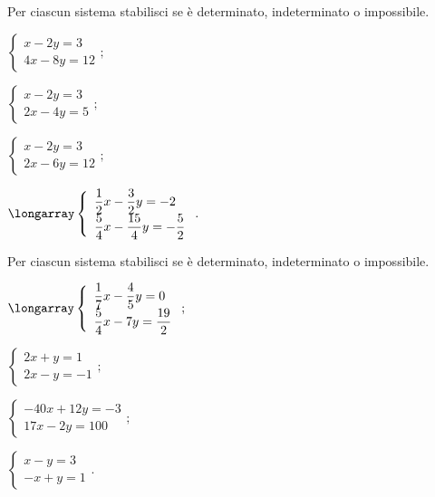 \begin{esercizio}
 \label{ese:19.33}
Per ciascun sistema stabilisci se è determinato, indeterminato o impossibile.
\begin{multicols}{2}
\begin{enumeratea}
\item $\left\{\begin{array}{l}x-2y=3 \\4x-8y=12\end{array}\right.;$
\item $\left\{\begin{array}{l}x-2y=3 \\2x-4y=5\end{array}\right.;$
\item $\left\{\begin{array}{l}x-2y=3 \\2x-6y=12\end{array}\right.;$
\item $\longarray\left\{\begin{array}{l}\dfrac{1}{2}x-\dfrac{3}{2}y=-2\\\dfrac{5}{4}x-\dfrac{15}{4}y=-{\dfrac{5}{2}}\end{array}\right..$
\end{enumeratea}
\end{multicols}
\end{esercizio}

\begin{esercizio}
 \label{ese:19.34}
Per ciascun sistema stabilisci se è determinato, indeterminato o impossibile.
\begin{multicols}{2}
\begin{enumeratea}
\item $\longarray\left\{\begin{array}{l}\dfrac{1}{7}x-\dfrac{4}{5}y=0\\\dfrac{5}{4}x-7y=\dfrac{19}{2}\end{array}\right.;$
\item $\left\{\begin{array}{l}2x+y=1 \\2x-y=-1\end{array}\right.;$
\item $\left\{\begin{array}{l}-40x+12y=-3\\17x-2y=100\end{array}\right.;$
\item $\left\{\begin{array}{l}x-y=3 \\-x+y=1 \end{array}\right..$
\end{enumeratea}
\end{multicols}
\end{esercizio}

